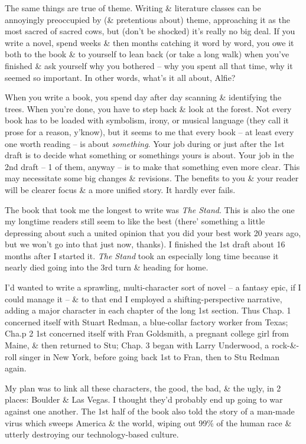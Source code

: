 \documentclass{article}
\numberwithin{equation}{section}
\begin{document}
 The same things are true of theme. Writing \& literature classes can be annoyingly preoccupied by (\& pretentious about) theme, approaching it as the most sacred of sacred cows, but (don't be shocked) it's really no big deal. If you write a novel, spend weeks \& then months catching it word by word, you owe it both to the book \& to yourself to lean back (or take a long walk) when you've finished \& ask yourself why you bothered -- why you spent all that time, why it seemed so important. In other words, what's it all about, Alfie?

When you write a book, you spend day after day scanning \& identifying the trees. When you're done, you have to step back \& look at the forest. Not every book has to be loaded with symbolism, irony, or musical language (they call it prose for a reason, y'know), but it seems to me that every book -- at least every one worth reading -- is about \textit{something}. Your job during or just after the 1st draft is to decide what something or somethings yours is about. Your job in the 2nd draft -- 1 of them, anyway -- is to make that something even more clear. This may necessitate some big changes \& revisions. The benefits to you \& your reader will be clearer focus \& a more unified story. It hardly ever fails.

The book that took me the longest to write was \textit{The Stand}. This is also the one my longtime readers still seem to like the best (there' something a little depressing about such a united opinion that you did your best work 20 years ago, but we won't go into that just now, thanks). I finished the 1st draft about 16 months after I started it. \textit{The Stand} took an especially long time because it nearly died going into the 3rd turn \& heading for home.

I'd wanted to write a sprawling, multi-character sort of novel -- a fantasy epic, if I could manage it -- \& to that end I employed a shifting-perspective narrative, adding a major character in each chapter of the long 1st section. Thus Chap. 1 concerned itself with Stuart Redman, a blue-collar factory worker from Texas; Cha.p 2 1st concerned itself with Fran Goldsmith, a pregnant college girl from Maine, \& then returned to Stu; Chap. 3 began with Larry Underwood, a rock-\&-roll singer in New York, before going back 1st to Fran, then to Stu Redman again.

My plan was to link all these characters, the good, the bad, \& the ugly, in 2 places: Boulder \& Las Vegas. I thought they'd probably end up going to war against one another. The 1st half of the book also told the story of a man-made virus which sweeps America \& the world, wiping out 99\% of the human race \& utterly destroying our technology-based culture.
\end{document}
